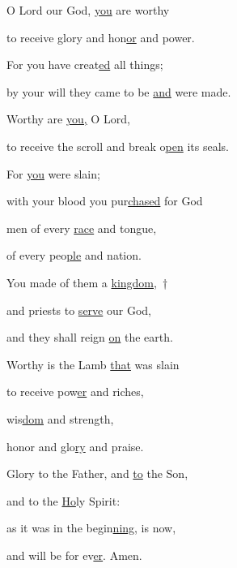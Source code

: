 \noindent O Lord our God, \uline{you} are worthy ~\GreStar{}~\nopagebreak

to receive glory and hon\uline{or} and power.

\noindent For you have creat\uline{ed} all things; ~\GreStar{}~\nopagebreak

by your will they came to be \uline{and} were made.

\noindent Worthy are \uline{you,} O Lord, ~\GreStar{}~\nopagebreak

to receive the scroll and break o\uline{pen} its seals.

\noindent For \uline{you} were slain; ~\GreStar{}~\nopagebreak

with your blood you pur\uline{chased} for God

\noindent men of every \uline{race} and tongue, ~\GreStar{}~\nopagebreak

of every peo\uline{ple} and nation.

\noindent You made of them a \uline{kingdom},~†~\nopagebreak

and priests to \uline{serve} our God, ~\GreStar{}~\nopagebreak

and they shall reign \uline{on} the earth.

\noindent Worthy is the Lamb \uline{that} was slain ~\GreStar{}~\nopagebreak

to receive pow\uline{er} and riches,

\noindent wis\uline{dom} and strength, ~\GreStar{}~\nopagebreak

honor and glo\uline{ry} and praise.

\noindent Glory to the Father, and \uline{to} the Son,~\GreStar{}~\nopagebreak

and to the \uline{Ho}ly Spirit:

\noindent as it was in the begin\uline{ning}, is now,~\GreStar{}~\nopagebreak

and will be for ev\uline{er}. Amen.

